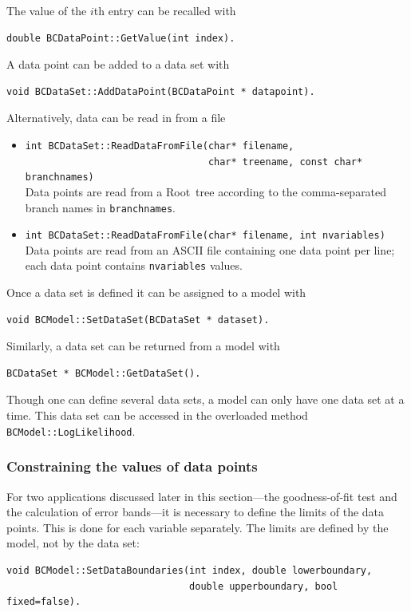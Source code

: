 \documentclass[11pt, a4paper]{article}
\newcommand{\Root}{{\sc Root}}
\newcommand{\code}[1]{\texttt{#1}}
\begin{document}
The value of the $i$th entry can be recalled with
%
\begin{verbatim}
double BCDataPoint::GetValue(int index).
\end{verbatim}

A data point can be added to a data set with
%
\begin{verbatim}
void BCDataSet::AddDataPoint(BCDataPoint * datapoint).
\end{verbatim}

Alternatively, data can be read in from a file
%
\begin{itemize}
\item
  \verb|int BCDataSet::ReadDataFromFile(char* filename,|\\
  \verb|                                char* treename, const char* branchnames)|\\
  Data points are read from a \Root\ tree according to the
  comma-separated branch names in \code{branchnames}.

\item \code{int BCDataSet::ReadDataFromFile(char* filename, int nvariables)}\\
  Data points are read from an ASCII file containing one data point
  per line; each data point contains \code{nvariables} values.
\end{itemize}

Once a data set is defined it can be assigned to a model with
%
\begin{verbatim}
void BCModel::SetDataSet(BCDataSet * dataset).
\end{verbatim}

Similarly, a data set can be returned from a model with
%
\begin{verbatim}
BCDataSet * BCModel::GetDataSet().
\end{verbatim}

Though one can define several data sets, a model can only have one
data set at a time. This data set can be accessed in the overloaded
method \verb|BCModel::LogLikelihood|.


\subsubsection{Constraining the values of data points}

For two applications discussed later in this section---the
goodness-of-fit test and the calculation of error bands---it is
necessary to define the limits of the data points. This is done for
each variable separately. The limits are defined by the model, not by
the data set:
%
\begin{verbatim}
void BCModel::SetDataBoundaries(int index, double lowerboundary,
                                double upperboundary, bool fixed=false).
\end{verbatim}
\end{document}
